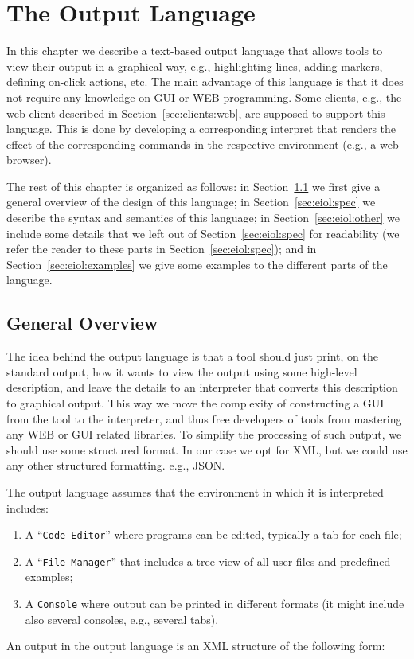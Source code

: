 {%
}

\chapter{The \ei Output Language}
\label{ch:eiol}

In this chapter we describe a text-based output language that allows
tools to view their output in a graphical way, e.g., highlighting
lines, adding markers, defining on-click actions, etc. The main
advantage of this language is that it does not require any knowledge
on GUI or WEB programming.
%
Some clients, e.g., the web-client described in
Section~\ref{sec:clients:web}, are supposed to support this
language. This is done by developing a corresponding interpret that
renders the effect of the corresponding commands in the respective
environment (e.g., a web browser).

The rest of this chapter is organized as follows: 
%
in Section~\ref{sec:eiol:overview} we first give a general overview of
the design of this language; 
%
in Section~\ref{sec:eiol:spec} we describe the syntax and semantics of
this language; 
%
in Section~\ref{sec:eiol:other} we include some details that we left
out of Section~\ref{sec:eiol:spec} for readability (we refer the
reader to these parts in Section~\ref{sec:eiol:spec}); and 
%
in Section~\ref{sec:eiol:examples} we give some examples to the
different parts of the language.



\section{General Overview}
\label{sec:eiol:overview}

The idea behind the \ei output language is that a tool should just
print, on the standard output, how it wants to view the output using
some high-level description, and leave the details to an interpreter
that converts this description to graphical output.
%
This way we move the complexity of constructing a GUI from the tool to
the interpreter, and thus free developers of tools from mastering any
WEB or GUI related libraries.
%
To simplify the processing of such output, we should use some
structured format. In our case we opt for XML, but we could use any
other structured formatting. e.g., JSON.


The \ei output language assumes that the environment in which it is
interpreted includes:
%
\begin{enumerate}

\item A ``\texttt{Code Editor}'' where programs can be edited,
  typically a tab for each file;
%
\item A ``\texttt{File Manager}'' that includes a tree-view of all
  user files and predefined examples;
%
\item A \texttt{Console} where output can be printed in different
  formats (it might include also several consoles, e.g., several
  tabs).
\end{enumerate}
%
An output in the \ei output language is an XML structure of the
following form:

